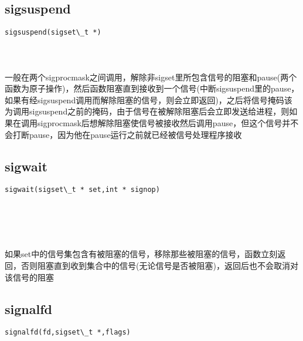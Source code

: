\documentclass[10pt,a4paper]{article}
\begin{document}
\subsection{sigsuspend}
\begin{spacing}{2.0}
\lstset{language=C,numbers=none}
\begin{lstlisting}
sigsuspend(sigset\_t *)
\end{lstlisting}
{\large\color[rgb]{0.2,0.4,0.6}{*:}}
\paragraph{ \ \ }一般在两个sigprocmask之间调用，解除非sigset里所包含信号的阻塞和pause(两个函数为原子操作)，然后函数阻塞直到接收到一个信号(中断sigsuspend里的pause，如果有经sigsuspend调用而解除阻塞的信号，则会立即返回)，之后将信号掩码该为调用sigsuspend之前的掩码，由于信号在被解除阻塞后会立即发送给进程，则如果在调用sigprocmask后想解除阻塞使信号被接收然后调用pause，但这个信号并不会打断pause，因为他在pause运行之前就已经被信号处理程序接收
\end{spacing}

\subsection{sigwait}
\begin{spacing}{2.0}
\lstset{language=C,numbers=none}
\begin{lstlisting}
sigwait(sigset\_t * set,int * signop)
\end{lstlisting}
{\large\color[rgb]{0.2,0.4,0.6}{set:}} \\
{\large\color[rgb]{0.2,0.4,0.6}{signop:}}
\paragraph{ \ \ }如果set中的信号集包含有被阻塞的信号，移除那些被阻塞的信号，函数立刻返回，否则阻塞直到收到集合中的信号(无论信号是否被阻塞)，返回后也不会取消对该信号的阻塞
\end{spacing}

\subsection{signalfd}
\begin{spacing}{2.0}
\lstset{language=C,numbers=none}
\begin{lstlisting}
signalfd(fd,sigset\_t *,flags)
\end{lstlisting}
{\large\color[rgb]{0.2,0.4,0.6}{fd:}} \\
{\large\color[rgb]{0.2,0.4,0.6}{*:}} \\
{\large\color[rgb]{0.2,0.4,0.6}{flags:}}
\paragraph{ \ \ }
\end{spacing}
\end{document}
